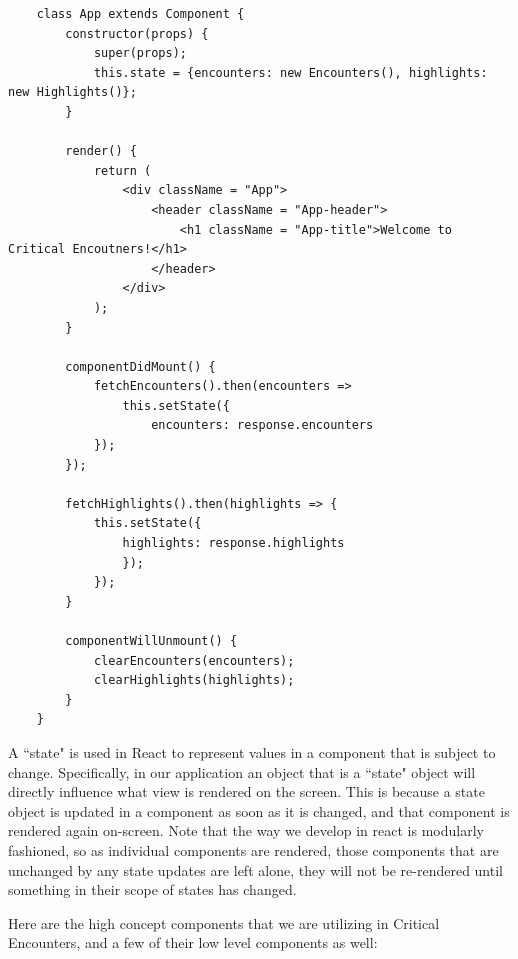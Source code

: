 \documentclass[12pt,a4paper]{report}
\begin{document}
	\newpage
	\begin{lstlisting}
	class App extends Component {
		constructor(props) {
			super(props);
			this.state = {encounters: new Encounters(), highlights: new Highlights()};
		}
	
		render() {
			return (
				<div className = "App">
					<header className = "App-header">
						<h1 className = "App-title">Welcome to Critical Encoutners!</h1>
					</header>
				</div>
			);
		}
	
		componentDidMount() {
			fetchEncounters().then(encounters =>
				this.setState({
					encounters: response.encounters
			});
		});
	
		fetchHighlights().then(highlights => {
			this.setState({
				highlights: response.highlights
				});
			});
		}
	
		componentWillUnmount() {
			clearEncounters(encounters);
			clearHighlights(highlights);
		}
	}
	\end{lstlisting}
	A ``state" is used in React to represent values in a component that is subject to change. Specifically, in our application an object that is a ``state" object will directly influence what view is rendered on the screen. This is because a state object is updated in a component as soon as it is changed, and that component is rendered again on-screen. Note that the way we develop in react is modularly fashioned, so as individual components are rendered, those components that are unchanged by any state updates are left alone, they will not be re-rendered until something in their scope of states has changed. \cite{react}
	
	Here are the high concept components that we are utilizing in Critical Encounters, and a few of their low level components as well:
\end{document}
